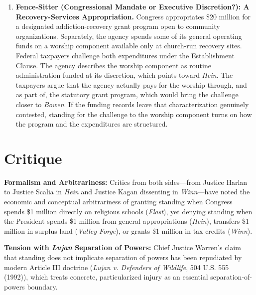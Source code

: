 \documentclass[12pt]{article}
\begin{document}
\begin{enumerate}
\item \textbf{Fence-Sitter (Congressional Mandate or Executive Discretion?): A Recovery-Services Appropriation.} Congress appropriates \$20 million for a designated addiction-recovery grant program open to community organizations. Separately, the agency spends some of its general operating funds on a worship component available only at church-run recovery sites. Federal taxpayers challenge both expenditures under the Establishment Clause. The agency describes the worship component as routine administration funded at its discretion, which points toward \textit{Hein}. The taxpayers argue that the agency actually pays for the worship through, and as part of, the statutory grant program, which would bring the challenge closer to \textit{Bowen}. If the funding records leave that characterization genuinely contested, standing for the challenge to the worship component turns on how the program and the expenditures are structured.

\end{enumerate}

\section{Critique}
\textbf{Formalism and Arbitrariness:} Critics from both sides---from Justice Harlan to Justice Scalia in \textit{Hein} and Justice Kagan dissenting in \textit{Winn}---have noted the economic and conceptual arbitrariness of granting standing when Congress spends \$1 million directly on religious schools (\textit{Flast}), yet denying standing when the President spends \$1 million from general appropriations (\textit{Hein}), transfers \$1 million in surplus land (\textit{Valley Forge}), or grants \$1 million in tax credits (\textit{Winn}).

\textbf{Tension with \textit{Lujan} Separation of Powers:} Chief Justice Warren's claim that standing does not implicate separation of powers has been repudiated by modern Article III doctrine (\textit{Lujan v. Defenders of Wildlife}, 504 U.S. 555 (1992)), which treats concrete, particularized injury as an essential separation-of-powers boundary.
\end{document}
